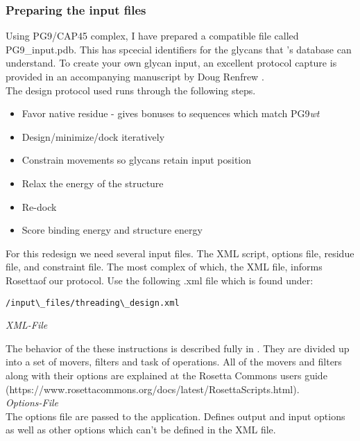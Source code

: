 \subsubsection{Preparing the input files}
Using PG9/CAP45 complex, I have prepared a \rosetta compatible file called PG9\_input.pdb. This has spcecial identifiers for the glycans that \rosetta 's database can understand. To create your own glycan input, an excellent protocol capture is provided in an accompanying manuscript by Doug Renfrew \citep{Renfrew:2012ci}. \\

The design protocol used runs through the following steps.

\begin{itemize}
\item Favor native residue - gives bonuses to sequences which match PG9\textit{wt}
\item Design/minimize/dock iteratively
\item Constrain movements so glycans retain input position
\item Relax the energy of the structure
\item Re-dock
\item Score binding energy and structure energy
\end{itemize}

For this redesign we need several input files. The XML script, options file, residue file, and constraint file. The most complex of which, the XML file, informs Rosettaof our protocol. Use the following .xml file which is found under:

\begin{verbatim}
/input\_files/threading\_design.xml
\end{verbatim}

\textit{XML-File}



The behavior of the these instructions is described fully in \citep{Fleishman:2011ji}. They are divided up into a set of movers, filters and task of operations. All of the movers and filters along with their options are explained at the Rosetta Commons users guide (https://www.rosettacommons.org/docs/latest/RosettaScripts.html). \\

\textit{Options-File}\\
The options file are passed to the application. Defines output and input options as well as other options which can't be defined in the XML file.


